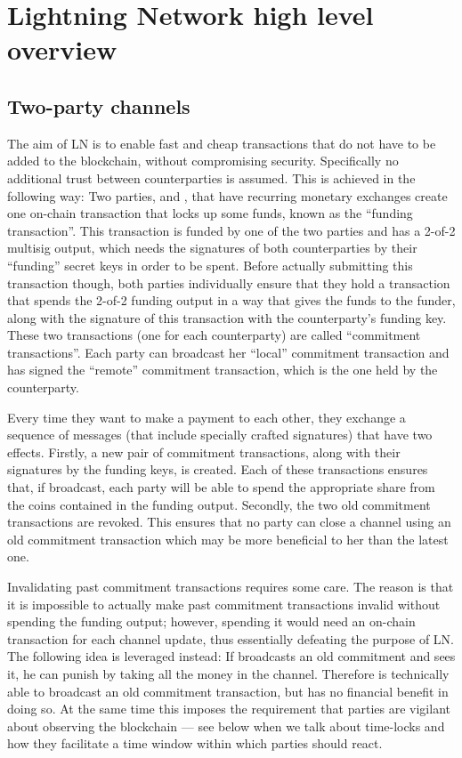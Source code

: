 \section{Lightning Network high level overview}
  \subsection{Two-party channels}
    The aim of LN is to enable fast and cheap transactions that do not have to
    be added to the blockchain, without compromising security. Specifically no
    additional trust between counterparties is assumed. This is achieved in the
    following way: Two parties, \alice{} and \bob, that have recurring monetary
    exchanges create one on-chain transaction that locks up some funds, known as
    the ``funding transaction''. This transaction is funded by one of the two
    parties and has a 2-of-2 multisig output, which needs the signatures of both
    counterparties by their ``funding'' secret keys in order to be spent. Before
    actually submitting this transaction though, both parties individually
    ensure that they hold a transaction that spends the 2-of-2 funding output in
    a way that gives the funds to the funder, along with the signature of this
    transaction with the counterparty's funding key. These two transactions (one
    for each counterparty) are called ``commitment transactions''. Each party
    can broadcast her ``local'' commitment transaction and has signed the
    ``remote'' commitment transaction, which is the one held by the
    counterparty.

    Every time they want to make a payment to each other, they exchange a
    sequence of messages (that include specially crafted signatures) that have
    two effects.  Firstly, a new pair of commitment transactions, along with
    their signatures by the funding keys, is created. Each of these transactions
    ensures that, if broadcast, each party will be able to spend the appropriate
    share from the coins contained in the funding output.  Secondly, the two old
    commitment transactions are revoked.  This ensures that no party can close a
    channel using an old commitment transaction which may be more beneficial to
    her than the latest one.

    Invalidating past commitment transactions requires some care. The reason is
    that it is impossible to actually make past commitment transactions invalid
    without spending the funding output; however, spending it would need an
    on-chain transaction for each channel update, thus essentially defeating the
    purpose of LN. The following idea is leveraged instead: If \alice{}
    broadcasts an old commitment and \bob{} sees it, he can punish \alice{} by
    taking all the money in the channel. Therefore \alice{} is technically able
    to broadcast an old commitment transaction, but has no financial benefit in
    doing so. At the same time this imposes the requirement that parties are
    vigilant about observing the blockchain --- see below when we talk about
    time-locks and how they facilitate a  time window within which  parties
    should react.

